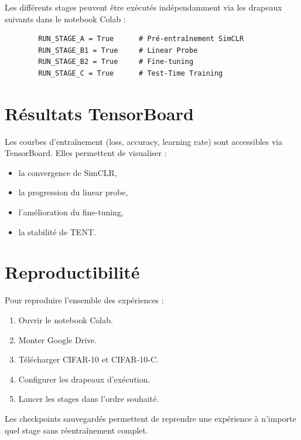 \documentclass[12pt,a4paper]{report}
\begin{document}
	Les différents stages peuvent être exécutés indépendamment via les drapeaux suivants dans le notebook Colab :
	
	\begin{verbatim}
		RUN_STAGE_A = True      # Pré-entraînement SimCLR
		RUN_STAGE_B1 = True     # Linear Probe
		RUN_STAGE_B2 = True     # Fine-tuning
		RUN_STAGE_C = True      # Test-Time Training
	\end{verbatim}
	
	\section{Résultats TensorBoard}
	
	Les courbes d’entraînement (loss, accuracy, learning rate) sont accessibles via TensorBoard. Elles permettent de visualiser :
	
	\begin{itemize}
		\item la convergence de SimCLR,
		\item la progression du linear probe,
		\item l’amélioration du fine-tuning,
		\item la stabilité de TENT.
	\end{itemize}
	
	\section{Reproductibilité}
	
	Pour reproduire l’ensemble des expériences :
	
	\begin{enumerate}
		\item Ouvrir le notebook Colab.
		\item Monter Google Drive.
		\item Télécharger CIFAR-10 et CIFAR-10-C.
		\item Configurer les drapeaux d’exécution.
		\item Lancer les stages dans l’ordre souhaité.
	\end{enumerate}
	
	Les checkpoints sauvegardés permettent de reprendre une expérience à n’importe quel stage sans réentraînement complet.
	
	
\end{document}
